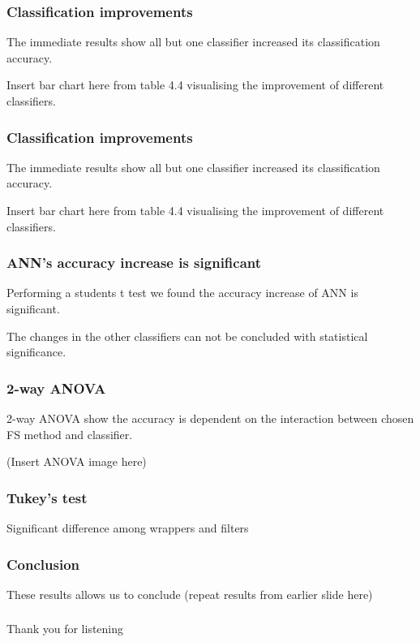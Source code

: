 \documentclass[aspectratio=1610]{beamer}
\begin{document}

\begin{frame}
  \frametitle{\hfill Classification improvements}
  The immediate results show all but one classifier increased its classification accuracy.

  Insert bar chart here from table 4.4 visualising the improvement of different classifiers.
\end{frame}

\begin{frame}
  \frametitle{\hfill Classification improvements}
  The immediate results show all but one classifier increased its classification accuracy.

  Insert bar chart here from table 4.4 visualising the improvement of different classifiers.
\end{frame}

\begin{frame}
  \frametitle{\hfill ANN's accuracy increase is significant}

  Performing a students t test we found the accuracy increase of ANN is significant.

  The changes in the other classifiers can not be concluded with statistical significance.
\end{frame}

\begin{frame}
  \frametitle{\hfill 2-way ANOVA}

  2-way ANOVA show the accuracy is dependent on the interaction between chosen FS method and classifier.

  (Insert ANOVA image here)
\end{frame}

\begin{frame}
  \frametitle{\hfill Tukey's test}
  Significant difference among wrappers and filters
\end{frame}

\begin{frame}
  \frametitle{\hfill Conclusion}
  These results allows us to conclude (repeat results from earlier slide here)
\end{frame}

\begin{frame}
  \frametitle{\hfill }
  Thank you for listening
\end{frame}
\end{document}
